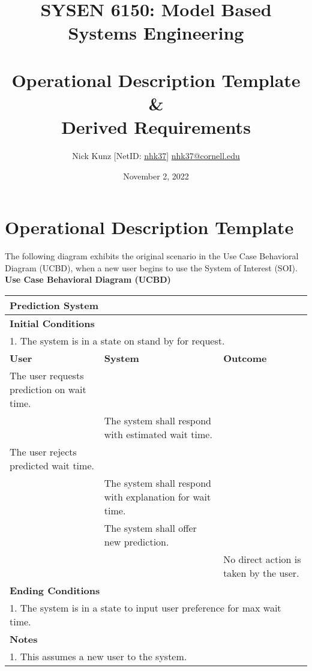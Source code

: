 \documentclass{article}
\begin{document}
\title{SYSEN 6150: Model Based Systems Engineering\\~\\
    \Large Operational Description Template \& \\
    Derived Requirements
}
\author{
    Nick Kunz [NetID: \url{nhk37}] \hyperlink{nhk37@cornell.edu}{nhk37@cornell.edu}
}
\date{November 2, 2022}
\maketitle
\thispagestyle{fancy}

\section*{Operational Description Template}
The following diagram exhibits the original scenario in the Use Case Behavioral Diagram (UCBD), when a new user begins to use the System of Interest (SOI).\\

\textbf{Use Case Behavioral Diagram (UCBD)}\\

\begin{tabular}{ | m{128pt} | m{128pt}| m{128pt} | }
    \hline
    \multicolumn{3}{|l|}{Prediction System} \\
    \hline
    \multicolumn{3}{|l|}{\textbf{Initial Conditions}} \\
    \hline
    \multicolumn{3}{|l|}{1. The system is in a state on stand by for request.} \\
    \hline
    \textbf{User} & \textbf{System} & \textbf{Outcome} \\ 
    \hline
    The user requests prediction on wait time. & \space & \space \\ 
    \hline
    \space & The system shall respond with estimated wait time. & \space \\
    \hline
    The user rejects predicted wait time. & \space & \space \\ 
    \hline
    \space & The system shall respond with explanation for wait time. & \space \\ 
    \hline
    \space & The system shall offer new prediction. & \space \\ 
    \hline
    \space & \space & No direct action is taken by the user. \\ 
    \hline
    \multicolumn{3}{|l|}{\textbf{Ending Conditions}} \\
    \hline
    \multicolumn{3}{|l|}{1. The system is in a state to input user preference for max wait time.} \\
    \hline
    \multicolumn{3}{|l|}{\textbf{Notes}} \\
    \hline
    \multicolumn{3}{|l|}{1. This assumes a new user to the system.} \\
    \hline
\end{tabular}\\
\end{document}
